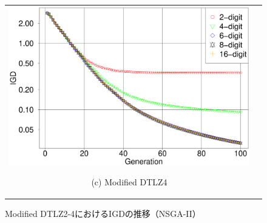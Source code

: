 \documentclass[../main/main]{subfiles}
\begin{document}
\begin{figure}[htbp]
\begin{tabular}{cc}
\begin{minipage}{0.32\hsize}
\includegraphics[width=1\linewidth]{../figures/NSGA-II/ano_DTLZ4_IGD.eps}
\begin{center}
{\footnotesize (c) Modified DTLZ4}
\end{center}
\end{minipage}
\end{tabular}
\caption{Modified DTLZ2-4におけるIGDの推移（NSGA-II）}
\label{fig:igd_mod_nsgaii}
\end{figure}
\end{document}
